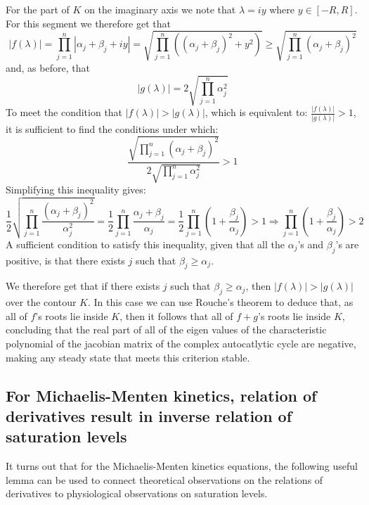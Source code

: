   For the part of $K$ on the imaginary axis we note that $\lambda=iy$ where $y\in[-R,R]$.
For this segment we therefore get that
\begin{equation*}
    |f(\lambda)|=\prod_{j=1}^n|\alpha_j+\beta_j+iy|=\sqrt{\prod_{j=1}^n((\alpha_j+\beta_j)^2+y^2)} \geq \sqrt{\prod_{j=1}^n(\alpha_j+\beta_j)^2}
 \end{equation*} 
 and, as before, that
 \begin{equation*}
     |g(\lambda)|=2\sqrt{\prod_{j=1}^n\alpha_j^2}
 \end{equation*}
 To meet the condition that $|f(\lambda)|>|g(\lambda)|$, which is equivalent to: $\frac{|f(\lambda)|}{|g(\lambda)|}>1$, it is sufficient to find the conditions under which:
 \begin{equation*}
   \frac{\sqrt{\prod_{j=1}^n(\alpha_j+\beta_j)^2}}{2\sqrt{\prod_{j=1}^n\alpha_j^2}}>1
 \end{equation*}
 Simplifying this inequality gives:
 \begin{equation*}
     \frac{1}{2}\sqrt{\prod_{j=1}^n\frac{(\alpha_j+\beta_j)^2}{\alpha_j^2}}= \frac{1}{2}\prod_{j=1}^n\frac{\alpha_j+\beta_j}{\alpha_j}= \frac{1}{2}\prod_{j=1}^n(1+\frac{\beta_j}{\alpha_j})>1 \Rightarrow \prod_{j=1}^n(1+\frac{\beta_j}{\alpha_j})>2
 \end{equation*}
 A sufficient condition to satisfy this inequality, given that all the $\alpha_j$'s and $\beta_j$'s are positive, is that there exists $j$ such that $\beta_j \geq \alpha_j$.

 We therefore get that if there exists $j$ such that  $\beta_j \geq \alpha_j$, then $|f(\lambda)|>|g(\lambda)|$ over the contour $K$.
 In this case we can use Rouche's theorem to deduce that, as all of $f$'s roots lie inside $K$, then it follows that all of $f+g$'s roots lie inside $K$, concluding that the real part of all of the eigen values of the characteristic polynomial of the jacobian matrix of the complex autocatlytic cycle are negative, making any steady state that meets this criterion stable.

    \subsection{For Michaelis-Menten kinetics, relation of derivatives result in inverse relation of saturation levels}
    It turns out that for the Michaelis-Menten kinetics equations, the following useful lemma can be used to connect theoretical observations on the relations of derivatives to physiological observations on saturation levels.

